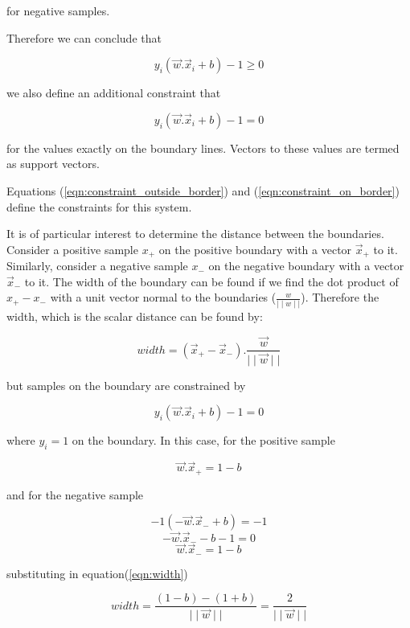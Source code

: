 \documentclass[]{article}
\begin{document}
for negative samples. 

Therefore we can conclude that

\begin{equation}
\label{eqn:constraint_outside_border}
y_i(\vec{w}.\vec{x}_{i} + b)-1 \geq 0
\end{equation}

we also define an additional constraint that 

\begin{equation}
\label{eqn:constraint_on_border}
y_i(\vec{w}.\vec{x}_{i} + b)-1 = 0
\end{equation}

for the values exactly on the boundary lines. Vectors to these values are termed as support vectors.

\bigskip

Equations (\ref{eqn:constraint_outside_border}) and (\eqref{eqn:constraint_on_border}) define the constraints for this system.


It is of particular interest to determine the distance between the boundaries. Consider a positive sample $x_{+}$ on the positive boundary with a vector $\vec{x}_{+}$ to it. Similarly, consider a negative sample $x_{-}$ on the negative boundary with a vector $\vec{x}_{-}$ to it. The width of the boundary can be found if we find the dot product of $x_{+} - x_{-}$ with a unit vector normal to the boundaries ($\frac{w}{\mid\mid w\mid\mid}$). Therefore the width, which is the scalar distance can be found by:

\begin{equation}
\label{eqn:width}
width = (\vec{x}_{+} - \vec{x}_{-}) . \frac{\vec{w}}{\mid\mid \vec{w} \mid\mid}
\end{equation}

but samples on the boundary are constrained by 

\[
y_i(\vec{w}.\vec{x}_{i} + b)-1 = 0
\]

where $y_i=1$ on the boundary. In this case, for the positive sample

\[
\vec{w}.\vec{x}_{+} = 1-b
\]

and for the negative sample

\[
-1(-\vec{w}.\vec{x}_{-} + b) = -1
\]
\[
-\vec{w}.\vec{x}_{-} - b -1 = 0
\]
\[
\vec{w}.\vec{x}_{-} = 1-b
\]

substituting in equation(\ref{eqn:width})


\begin{equation}
width = \frac{(1-b)-(1+b)}{\mid\mid \vec{w} \mid\mid} = \frac{2}{\mid\mid \vec{w} \mid\mid}
\end{equation}
\end{document}

